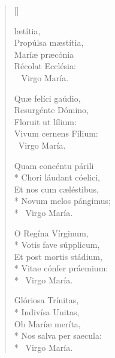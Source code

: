\newHymn
{}

\begin{multicols}{2}
\begin{verse}[\versewidth]

 lætítia,\\
Propúlsa mæstítia,\\
Maríæ præcónia\\
Récolat Ecclésia:\\
~ \quad Virgo María.

Quæ felíci gaúdio,\\
Resurgénte Dómino,\\
Floruit ut lílium:\\
Vivum cernens Fílium:\\
\ \quad Virgo María.

Quam concéntu párili\\*
Chori láudant cóelici,\\
Et nos cum cæléstibus,\\*
Novum melos pángimus;\\*
\ \quad Virgo María.

O Regína Vírginum,\\*
Votis fave súpplicum,\\
Et post mortis stádium,\\*
Vitae cónfer práemium:\\*
\ \quad Virgo María.

Glóriosa Trínitas,\\*
Indivísa Unitas,\\
Ob Maríæ meríta,\\*
Nos salva per saecula:\\*
\ \quad Virgo María.

\end{verse}
\end{multicols}


